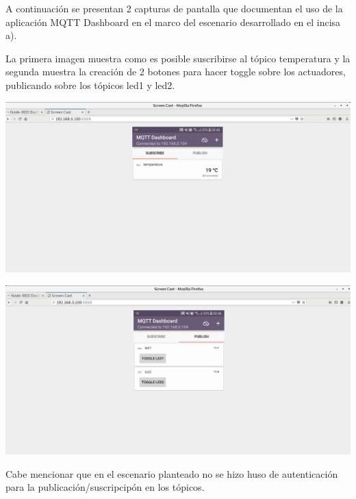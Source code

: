 \documentclass[11pt]{article}
\makeatletter
\def\maxwidth{\ifdim\Gin@nat@width>\linewidth\linewidth
    \else\Gin@nat@width\fi}
\let\Oldincludegraphics\includegraphics
\renewcommand{\includegraphics}[1]{\Oldincludegraphics[width=.8\maxwidth]{#1}}
\makeatother
\begin{document}
    A continuación se presentan 2 capturas de pantalla que documentan el uso
de la aplicación MQTT Dashboard en el marco del escenario desarrollado
en el incisa a).

La primera imagen muestra como es posible suscribirse al tópico
temperatura y la segunda muestra la creación de 2 botones para hacer
toggle sobre los actuadores, publicando sobre los tópicos led1 y led2.

    \includegraphics{images/dashboard-subs.png}

    \includegraphics{images/dashboard-pub.png}

    Cabe mencionar que en el escenario planteado no se hizo huso de
autenticación para la publicación/suscripcipón en los tópicos.


    
    
    
    
\end{document}
